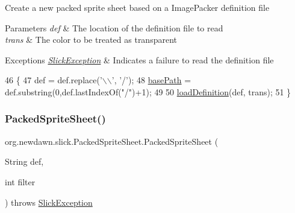 Create a new packed sprite sheet based on a Image\+Packer definition file


\begin{DoxyParams}{Parameters}
{\em def} & The location of the definition file to read \\
\hline
{\em trans} & The color to be treated as transparent \\
\hline
\end{DoxyParams}

\begin{DoxyExceptions}{Exceptions}
{\em \mbox{\hyperlink{classorg_1_1newdawn_1_1slick_1_1_slick_exception}{Slick\+Exception}}} & Indicates a failure to read the definition file \\
\hline
\end{DoxyExceptions}

\begin{DoxyCode}
46                                                                             \{
47         def = def.replace(\textcolor{charliteral}{'\(\backslash\)\(\backslash\)'}, \textcolor{charliteral}{'/'});
48         \mbox{\hyperlink{classorg_1_1newdawn_1_1slick_1_1_packed_sprite_sheet_a5343b639d543ab4780adabb0f8ac15cd}{basePath}} = def.substring(0,def.lastIndexOf(\textcolor{stringliteral}{"/"})+1);
49         
50         \mbox{\hyperlink{classorg_1_1newdawn_1_1slick_1_1_packed_sprite_sheet_a35e3dcf7f2143738d56291dca1ed620e}{loadDefinition}}(def, trans);
51     \}
\end{DoxyCode}
\mbox{\label{classorg_1_1newdawn_1_1slick_1_1_packed_sprite_sheet_ae6cbc529dc62ad4ed721ec2ee60e7290}} 
\subsubsection{\texorpdfstring{Packed\+Sprite\+Sheet()}{PackedSpriteSheet()}\hspace{0.1cm}{\footnotesize\ttfamily [3/4]}}
{\footnotesize\ttfamily org.\+newdawn.\+slick.\+Packed\+Sprite\+Sheet.\+Packed\+Sprite\+Sheet (\begin{DoxyParamCaption}\item[{String}]{def,  }\item[{int}]{filter }\end{DoxyParamCaption}) throws \mbox{\hyperlink{classorg_1_1newdawn_1_1slick_1_1_slick_exception}{Slick\+Exception}}\hspace{0.3cm}{\ttfamily [inline]}}

